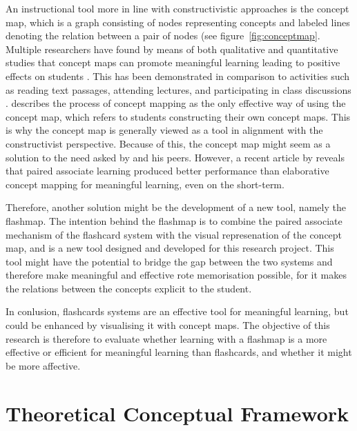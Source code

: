 An instructional tool more in line with constructivistic approaches is the concept map, which is a graph consisting of nodes representing concepts and labeled lines denoting the relation between a pair of nodes \cite{ruiz1} (see figure~\ref{fig:conceptmap}. Multiple researchers have found by means of both qualitative and quantitative studies that concept maps can promote meaningful learning leading to positive effects on students \cite{hwang2, subramaniam, canas}. This has been demonstrated in comparison to activities such as reading text passages, attending lectures, and participating in class discussions \cite{singh, nesbit2}.  describes the process of concept mapping as the only effective way of using the concept map, which refers to students constructing their own concept maps. This is why the concept map is generally viewed as a tool in alignment with the constructivist perspective. Because of this, the concept map might seem as a solution to the need asked by  and his peers. However, a recent article by  reveals that paired associate learning produced better performance than elaborative concept mapping for meaningful learning, even on the short-term.


Therefore, another solution might be the development of a new tool, namely the flashmap. The intention behind the flashmap is to combine the paired associate mechanism of the flashcard system with the visual represenation of the concept map, and is a new tool designed and developed for this research project. This tool might have the potential to bridge the gap between the two systems and therefore make meaningful and effective rote memorisation possible, for it makes the relations between the concepts explicit to the student.


In conlusion, flashcards systems are an effective tool for meaningful learning, but could be enhanced by visualising it with concept maps. The objective of this research is therefore to evaluate whether learning with a flashmap is a more effective or efficient for meaningful learning than flashcards, and whether it might be more affective.

\section{Theoretical Conceptual Framework}

